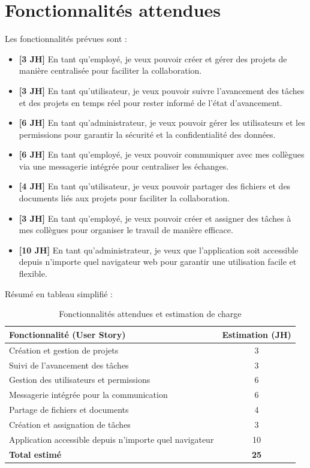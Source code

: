 \section{Fonctionnalités attendues}

Les fonctionnalités prévues sont :

 \begin{itemize}
  \item \textbf{[3 JH]} En tant qu'employé, je veux pouvoir créer et gérer des projets de manière centralisée pour faciliter la collaboration.
  \item \textbf{[3 JH]} En tant qu'utilisateur, je veux pouvoir suivre l'avancement des tâches et des projets en temps réel pour rester informé de l'état d'avancement.
  \item \textbf{[6 JH]} En tant qu'administrateur, je veux pouvoir gérer les utilisateurs et les permissions pour garantir la sécurité et la confidentialité des données.
  \item \textbf{[6 JH]} En tant qu'employé, je veux pouvoir communiquer avec mes collègues via une messagerie intégrée pour centraliser les échanges.
  \item \textbf{[4 JH]} En tant qu'utilisateur, je veux pouvoir partager des fichiers et des documents liés aux projets pour faciliter la collaboration.
  \item \textbf{[3 JH]} En tant qu'employé, je veux pouvoir créer et assigner des tâches à mes collègues pour organiser le travail de manière efficace.
  \item \textbf{[10 JH]} En tant qu'administrateur, je veux que l'application soit accessible depuis n'importe quel navigateur web pour garantir une utilisation facile et flexible.
\end{itemize}
\bigskip
Résumé en tableau simplifié :

\begin{table}[H]
\centering
\begin{tabular}{|p{8cm}|c|}
\hline
Fonctionnalité (User Story) & Estimation (JH) \\
\hline
Création et gestion de projets & 3 \\
Suivi de l'avancement des tâches & 3 \\
Gestion des utilisateurs et permissions & 6 \\
Messagerie intégrée pour la communication & 6 \\
Partage de fichiers et documents & 4 \\
Création et assignation de tâches & 3 \\
Application accessible depuis n'importe quel navigateur & 10 \\
\hline
\textbf{Total estimé} & \textbf{25} \\
\hline
\end{tabular}
\caption{Fonctionnalités attendues et estimation de charge}
\end{table}
